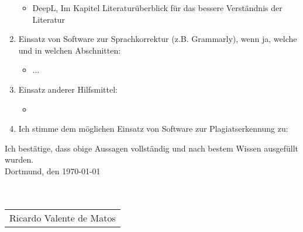 \begin{enumerate}
	\begin{itemize}
		\item DeepL, Im Kapitel Literaturüberblick für das bessere Verständnis der Literatur
	\end{itemize}
	\item Einsatz von Software zur Sprachkorrektur (z.B. Grammarly), wenn ja, welche und in welchen Abschnitten:
	\begin{itemize}
		\item ...
	\end{itemize}
	\item Einsatz anderer Hilfsmittel:
	\begin{itemize}
		\item 
	\end{itemize}
	\item Ich stimme dem möglichen Einsatz von Software zur Plagiatserkennung zu:
\end{enumerate}

Ich bestätige, dass obige Aussagen vollständig und nach bestem Wissen ausgefüllt wurden.\\

Dortmund, den \today \\ \\ \\
\begin{tabular}{@{}l@{}}\hline
	Ricardo Valente de Matos
\end{tabular}